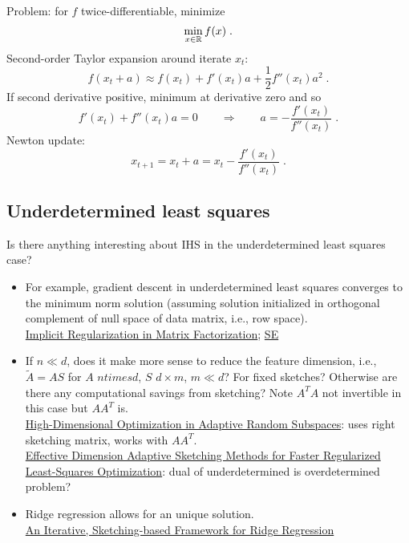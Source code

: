 \documentclass[10pt]{article}
\begin{document}
Problem: for $f$ twice-differentiable, minimize
\[
\min_{x\in\mathbb{R}} f(x) \;.
\]
Second-order Taylor expansion around iterate $x_t$:
\[
f(x_t+a) \approx f(x_t) + f'(x_t)a + \frac{1}{2}f''(x_t)a^2 \;.
\]
If second derivative positive, minimum at derivative zero and so
\[
f'(x_t) + f''(x_t)a = 0 \qquad \Rightarrow\qquad a = -\frac{f'(x_t)}{f''(x_t)} \;.
\]
Newton update:
\[
x_{t+1} = x_t +a = x_t - \frac{f'(x_t)}{f''(x_t)} \;.
\]


\subsection{Underdetermined least squares}

Is there anything interesting about IHS in the underdetermined least squares case?
\begin{itemize}

\item
For example, gradient descent in underdetermined least squares converges to the minimum norm solution (assuming solution initialized in orthogonal complement of null space of data matrix, i.e., row space). \\
\href{https://arxiv.org/pdf/1705.09280.pdf}{Implicit Regularization in Matrix Factorization}; \href{https://math.stackexchange.com/questions/3451272/does-gradient-descent-converge-to-a-minimum-norm-solution-in-least-squares-probl}{SE}

\item
If $n\ll d$, does it make more sense to reduce the feature dimension, i.e., $\tilde{A}=AS$ for $A$ $n times d$, $S$ $d\times m$, $m\ll d$? For fixed sketches? Otherwise are there any computational savings from sketching? Note $A^TA$ not invertible in this case but $AA^T$ is. \\
\href{https://proceedings.neurips.cc/paper/2019/file/51425b752a0b402ed3effc83fc4bbb74-Paper.pdf}{High-Dimensional Optimization in Adaptive Random Subspaces}: uses right sketching matrix, works with $AA^T$. \\
\href{https://arxiv.org/pdf/2006.05874.pdf}{Effective Dimension Adaptive Sketching Methods for Faster Regularized Least-Squares Optimization}: dual of underdetermined is overdetermined problem?

\item
Ridge regression allows for an unique solution. \\
\href{https://proceedings.mlr.press/v80/chowdhury18a/chowdhury18a.pdf}{An Iterative, Sketching-based Framework for Ridge Regression}

\end{itemize}
\end{document}
